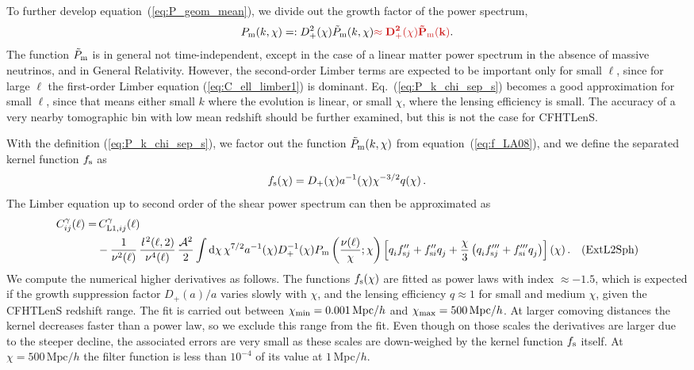 \documentclass[fleqn,usenatbib]{mnras} %
\newcommand{\ellbar}{\hbox{\it \l}\,}
\newcommand{\pref}{{\cal A}}
\newcommand{\forref}[1]{{\bf\textcolor{darkred}{#1}}}
\newcommand{\Label}[1]{\quad (\mbox{#1})}
\begin{document}
To further develop equation~(\ref{eq:P_geom_mean}), we divide out the growth factor of
the power spectrum,
%
\begin{equation}
 P_{\rm m}(k, \chi) =: D^2_+(\chi) \tilde P_{\rm m}(k, \chi) \forref{\approx D^2_+(\chi) \tilde P_{\rm m}(k)}.
  \label{eq:P_k_chi_sep_s}
\end{equation}
%
The function $\tilde P_{\rm m}$ is in general not time-independent, except
in the case of a linear matter power spectrum in the absence of massive
neutrinos, and in General Relativity. However, the second-order Limber terms
are expected to be important only for small $\ell$, since for large $\ell$ the first-order
Limber equation (\ref{eq:C_ell_limber1}) is dominant. Eq.~(\ref{eq:P_k_chi_sep_s})
becomes a good approximation for small $\ell$, since that means either small
$k$ where the evolution is linear, or small $\chi$, where the lensing
efficiency is small. The accuracy of a very nearby tomographic bin with low
mean redshift should be further examined, but this is not the case for
CFHTLenS.

With the definition (\ref{eq:P_k_chi_sep_s}), we factor out the function
$\tilde P_{\rm m}(k, \chi)$ from equation~(\ref{eq:f_LA08}), and we define the
separated kernel function $f_{\rm s}$ as
%
\begin{equation}
  f_{\rm s}(\chi) = D_+(\chi) a^{-1}(\chi) \chi^{-3/2} q(\chi) \, .
  \label{eq:f_LA08_s}
\end{equation}
%
The Limber equation up to second order of the shear power spectrum can then be approximated as
%
\begin{align}
  C^\gamma_{ij}(\ell) = & \, C^\gamma_{{\rm L1}, ij}(\ell) 
    \nonumber \\
    & - \frac 1 {\nu^2(\ell)} \, \frac{\ellbar^2(\ell, 2)}{\nu^4(\ell)} \,
    \frac{\pref^2}{2}
    \int {\rm d} \chi \, \chi^{7/2} a^{-1}(\chi) D_+^{-1}(\chi) P_{\rm m}\left(\frac{\nu(\ell)}\chi; \chi\right)
    \left[ q^{}_i f^{\prime\prime}_{{\rm s} j} + f^{\prime\prime}_{{\rm s}i} q^{}_j
      + \frac{\chi}{3} \left(
        q^{}_i f^{\prime\prime\prime}_{{\rm s}j} + f^{\prime\prime\prime}_{{\rm s}i} q^{}_j
      \right)
    \right](\chi) \, . \Label{ExtL2Sph}
  \label{eq:C_ell_limber2_dr_s}
\end{align}
%
We compute the numerical higher derivatives as follows. The functions $f_{\rm
s}(\chi)$ are fitted as power laws with index $\approx -1.5$, which is
expected if the growth suppression factor $D_+(a)/a$ varies slowly with $\chi$,
and the lensing efficiency $q \approx 1$ for small and medium $\chi$, given the
CFHTLenS redshift range. The fit is carried out between $\chi_{\rm min} = 0.001
\, {\rm Mpc}/h$ and $\chi_{\rm max} = 500 \, \mbox{Mpc}/h$. At larger comoving
distances the kernel decreases faster than a power law, so we exclude this
range from the fit. Even though on those scales the derivatives are larger due
to the steeper decline, the associated errors are very small as these scales
are down-weighed by the kernel function $f_{\rm s}$ itself. At $\chi = 500 \,
\mbox{Mpc}/h$ the filter function is less than $10^{-4}$ of its value 
at $1$\,Mpc$/h$.
\end{document}
